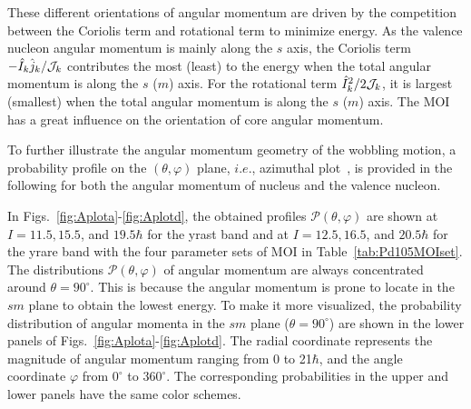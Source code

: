 \documentclass[aps,prc,preprint,showpacs,groupedaddress,floatfix,amsmath,amssymb]{revtex4-1}
\begin{document}
These different orientations of angular momentum are driven by the competition between the Coriolis term and rotational term to minimize energy.
As the valence nucleon angular momentum is mainly along the $s$ axis, the Coriolis term $-\hat{I}_{k}\hat{j}_{k}/{\cal J}_{k}$ contributes the most (least) to the energy  when the total angular momentum is along the $s$ ($m$) axis.
For the rotational term $\hat{I}_{k}^{2}/2{\cal J}_{k}$, it is largest (smallest) when the total angular momentum is along the $s$ ($m$) axis.
The MOI has a great influence on the orientation of core angular momentum.


To further illustrate the angular momentum geometry of
the wobbling motion, a probability profile on the $(\theta, \varphi)$
plane, $i.e.$, azimuthal plot~\cite{Streck18,CFQ17,CQB18,CQB19}, is provided in the following for both the angular momentum of nucleus and the valence nucleon.


In Figs.~\ref{fig:Aplota}-\ref{fig:Aplotd}, the obtained profiles $\mathcal{P}(\theta, \varphi)$ are shown at $I=11.5, 15.5$, and $19.5 \hbar$ for the yrast band and at $I=12.5,16.5$, and $20.5 \hbar$ for the yrare band with the four parameter sets of MOI in Table~\ref{tab:Pd105MOIset}. The distributions $\mathcal{P}(\theta, \varphi)$ of angular momentum are always concentrated around $\theta=90^{\circ}$.
This is because the angular momentum is prone to locate in the $sm$ plane to obtain the lowest energy.
To make it more visualized, the probability distribution of angular momenta in the $sm$ plane ($\theta=90^{\circ}$) are shown in the lower panels of Figs.~\ref{fig:Aplota}-\ref{fig:Aplotd}.
The radial coordinate represents the magnitude of angular momentum ranging from 0 to 21$\hbar$, and the angle coordinate $\varphi$ from $0^{\circ}$ to $360^{\circ}$.
The corresponding probabilities in the upper and lower panels have the same color schemes.
\end{document}
